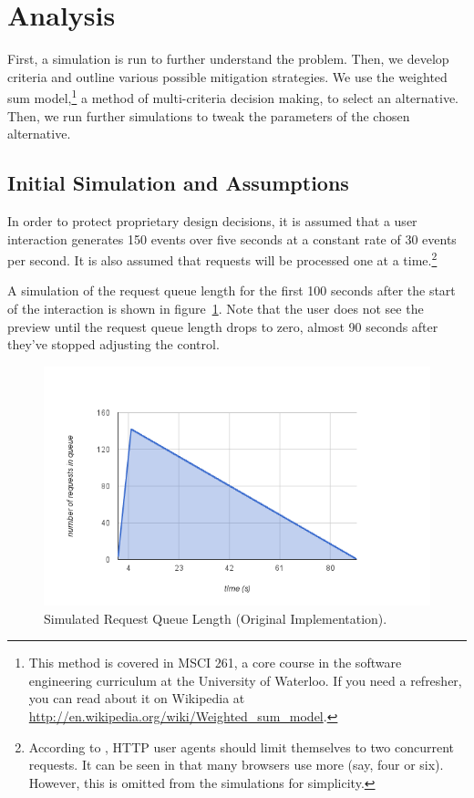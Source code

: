 \documentclass[se,resubmit]{uw-wkrpt}
\begin{document}
\section{Analysis}
First, a simulation is run to further understand the problem. Then, we
develop criteria and outline various possible mitigation strategies. We use
the weighted sum model,\footnote{This method is covered in MSCI 261, a core
course in the software engineering curriculum at the University of
Waterloo. If you need a refresher, you can read about it on Wikipedia at
\url{http://en.wikipedia.org/wiki/Weighted_sum_model}.} a method of
multi-criteria decision making, to select an alternative. Then, we run
further simulations to tweak the parameters of the chosen alternative.

\subsection{Initial Simulation and Assumptions}\label{sec:assumptions}
In order to protect proprietary design decisions, it is assumed that a
user interaction generates 150 events over five seconds at a constant rate
of 30 events per second. It is also assumed that requests will be
processed one at a time.\footnote{According to \cite{ref:http}, HTTP user
agents should limit themselves to two concurrent requests. It can be seen
in \cite{ref:b423377} that many browsers use more (say, four or six).
However, this is omitted from the simulations for simplicity.}

A simulation of the request queue length for the first 100 seconds after
the start of the interaction is shown in figure~\ref{fig:sim-orig}. Note
that the user does not see the preview until the request queue length drops
to zero, almost 90 seconds after they've stopped adjusting the control.

\begin{figure}
  \centering
  \includegraphics[width=6.25in]{sim-orig}
  \caption{Simulated Request Queue Length (Original Implementation).}
  \label{fig:sim-orig}
\end{figure}
\end{document}

